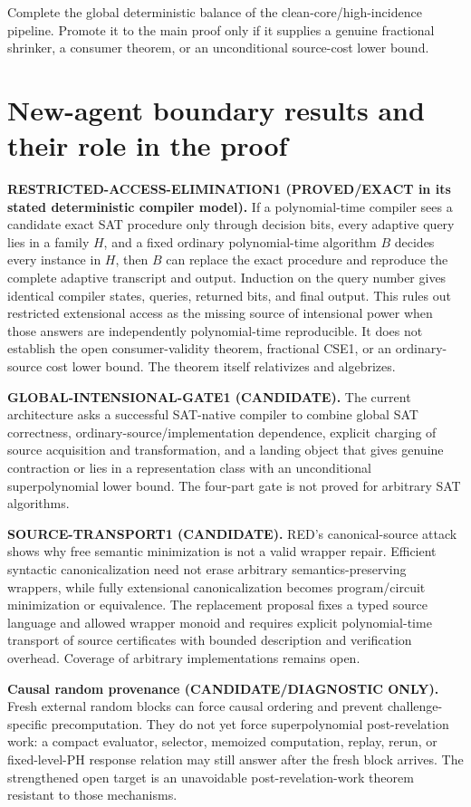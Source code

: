 \documentclass[11pt]{article}
\theoremstyle{plain}
\theoremstyle{definition}
\theoremstyle{remark}
\begin{document}
Complete the global deterministic balance of the clean-core/high-incidence
pipeline.  Promote it to the main proof only if it supplies a genuine
fractional shrinker, a consumer theorem, or an unconditional source-cost
lower bound.

\section{New-agent boundary results and their role in the proof}

\textbf{RESTRICTED-ACCESS-ELIMINATION1 (PROVED/EXACT in its stated deterministic compiler model).}
If a polynomial-time compiler sees a candidate exact SAT procedure only
through decision bits, every adaptive query lies in a family \(H\), and a
fixed ordinary polynomial-time algorithm \(B\) decides every instance in
\(H\), then \(B\) can replace the exact procedure and reproduce the complete
adaptive transcript and output.  Induction on the query number gives identical
compiler states, queries, returned bits, and final output.  This rules out
restricted extensional access as the missing source of intensional power when
those answers are independently polynomial-time reproducible.  It does not establish the open consumer-validity theorem, fractional CSE1, or an ordinary-source cost lower bound.  The theorem itself relativizes and
algebrizes.

\textbf{GLOBAL-INTENSIONAL-GATE1 (CANDIDATE).}
The current architecture asks a successful SAT-native compiler to combine
global SAT correctness, ordinary-source/implementation dependence, explicit
charging of source acquisition and transformation, and a landing object that
gives genuine contraction or lies in a representation class with an
unconditional superpolynomial lower bound.  The four-part gate is not proved
for arbitrary SAT algorithms.

\textbf{SOURCE-TRANSPORT1 (CANDIDATE).}
RED's canonical-source attack shows why free semantic minimization is not a
valid wrapper repair.  Efficient syntactic canonicalization need not erase
arbitrary semantics-preserving wrappers, while fully extensional
canonicalization becomes program/circuit minimization or equivalence.  The
replacement proposal fixes a typed source language and allowed wrapper monoid
and requires explicit polynomial-time transport of source certificates with
bounded description and verification overhead.  Coverage of arbitrary
implementations remains open.

\textbf{Causal random provenance (CANDIDATE/DIAGNOSTIC ONLY).}
Fresh external random blocks can force causal ordering and prevent
challenge-specific precomputation.  They do not yet force superpolynomial
post-revelation work: a compact evaluator, selector, memoized computation,
replay, rerun, or fixed-level-PH response relation may still answer after the
fresh block arrives.  The strengthened open target is an unavoidable
post-revelation-work theorem resistant to those mechanisms.
\end{document}
